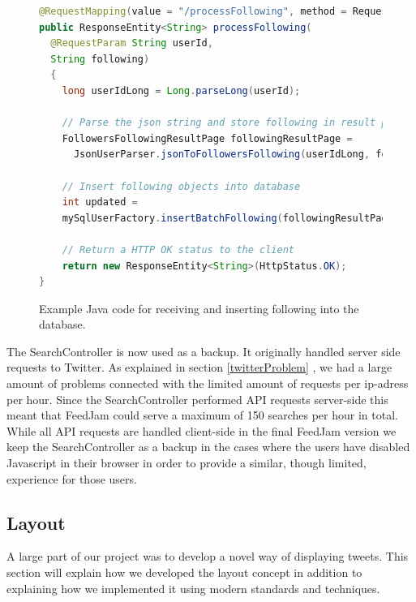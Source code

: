 \begin{figure}[h!]
\begin{lstlisting}[language=java]
@RequestMapping(value = "/processFollowing", method = RequestMethod.POST)
public ResponseEntity<String> processFollowing(
  @RequestParam String userId,
  String following) 
  {
    long userIdLong = Long.parseLong(userId);
    
    // Parse the json string and store following in result page object
    FollowersFollowingResultPage followingResultPage = 
      JsonUserParser.jsonToFollowersFollowing(userIdLong, following);
    
    // Insert following objects into database
    int updated = 
    mySqlUserFactory.insertBatchFollowing(followingResultPage);

    // Return a HTTP OK status to the client				
    return new ResponseEntity<String>(HttpStatus.OK);
}
\end{lstlisting}
\caption{Example Java code for receiving and inserting following into the database.}
\label{javaProcessFollowing}
\end{figure}

The SearchController is now used as a backup. It originally handled server side requests to Twitter. As explained in section \ref{twitterProblem} , we had a large amount of problems connected with the limited amount of requests per ip-adress per hour. Since the SearchController performed API requests server-side this meant that FeedJam could serve a maximum of 150 searches per hour in total. While all API requests are handled client-side in the final FeedJam version we keep the SearchController as a backup in the cases where the users have disabled Javascript in their browser in order to provide a similar, though limited, experience for those users.



\subsection{Layout} %
A large part of our project was to develop a novel way of displaying tweets. This section will explain how we developed the layout concept in addition to explaining how we implemented it using modern standards and techniques.

